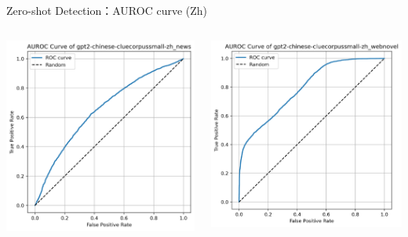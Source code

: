 \documentclass[serif]{beamer}
\begin{document}
\begin{frame}{Zero-shot Detection：AUROC curve (Zh)}
\begin{columns}[t]
    \centering
    \includegraphics[width=\linewidth]{images/gpt2-chinese-cluecorpussmall-zh_news.png}

    \centering
    \includegraphics[width=\linewidth]{images/gpt2-chinese-cluecorpussmall-zh_webnovel.png}


\end{columns}
\end{frame}
\end{document}
